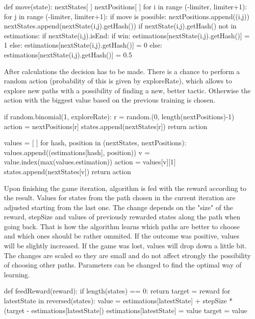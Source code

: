 \documentclass[a4paper,12pt]{book}
\begin{document}
\begin{python}
def move(state):
    nextStates[ ]
    nextPositions[ ]
      for i in range (-limiter, limiter+1):
        for j in range (-limiter, limiter+1):
          if move is possible:
            nextPositions.append((i,j))
            nextStates.append(nextState(i,j).getHash())
            if nextState(i,j).getHash() not in estimations:
            if nextState(i,j).isEnd:
              if win:
                estimations[nextState(i,j).getHash()] = 1
              else:
                estimations[nextState(i,j).getHash()] = 0
            else:
              estimations[nextState(i,j).getHash()] = 0.5
\end{python}
 
After calculations the decision has to be made. There is a chance to perform a random action (probability of this is given by exploreRate), which allows to explore new paths with a possibility of finding a new, better tactic. Otherwise the action with the biggest value based on the previous training is chosen.

\begin{python}
if random.binomial(1, exploreRate):
	r = random.(0, length(nextPositions)-1)
	action = nextPositions[r]
	states.append(nextStates[r])
	return action

values = [ ]
for hash, position in (nextStates, nextPositions):
	values.append((estimations[hash], position))
v = value.index(max(values.estimation))
action = values[v][1]
states.append(nextStates[v])
return action	
\end{python}

Upon finishing the game iteration, algorithm is fed with the reward according to the result. Values for states from the path chosen in the current iteration are adjusted starting from the last one. The change depends on the "size" of the reward, stepSize and values of previously rewarded states along the path when going back. 
That is how the algorithm learns which paths are better to choose and which ones should be rather ommited. If the outcome was positive, values will be slightly increased. If the game was lost, values will drop down a little bit. The changes are scaled so they are small and do not affect strongly the possibility of choosing other paths. Parameters can be changed to find the optimal way of learning.

\begin{python}
def feedReward(reward):
  if length(states) == 0:
    return
  target = reward
  for latestState in reversed(states):
    value = estimations[latestState] 
		+ stepSize * (target - estimations[latestState])
    estimations[latestState] = value
    target = value
\end{python}
\end{document}
